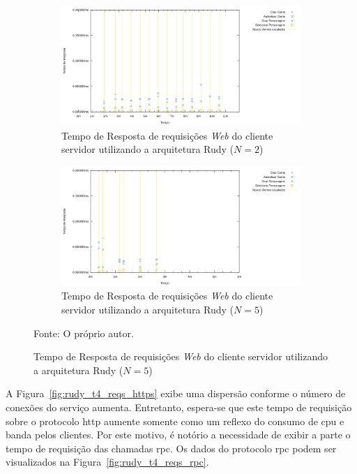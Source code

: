 \begin{figure}[htb!]
    \caption{Tempo de Resposta de requisições \textit{Web} do cliente servidor utilizando a arquitetura Rudy ($N=2$ e $N=5$)}
    \centering
    \begin{subfigure}{1.0\textwidth}
      \centering
      \includegraphics[width=.9\textwidth]{metricas_rudy_t5/rudyc_http.png}
      \caption{Tempo de Resposta de requisições \textit{Web} do cliente servidor utilizando a arquitetura Rudy ($N=2$)}
      \label{fig:rudy_t5_reqs_https}
    \end{subfigure}


    \begin{subfigure}{1.0\textwidth}
      \centering
      \includegraphics[width=.9\textwidth]{metricas_rudy_t6/rudyc_http.png}
      \caption{Tempo de Resposta de requisições \textit{Web} do cliente servidor utilizando a arquitetura Rudy ($N=5$)}
      \label{fig:rudy_t6_reqs_https}
    \end{subfigure}
    \label{fig:rudy_t56_reqs_https}

    Fonte: O próprio autor.
\end{figure}

A Figura~\ref{fig:rudy_t4_reqs_https} exibe uma dispersão conforme o número de conexões do serviço aumenta.
%
Entretanto, espera-se que este tempo de requisição sobre o protocolo \ac{http} aumente somente como um reflexo do consumo de \ac{cpu} e banda pelos clientes.
%
Por este motivo, é notório a necessidade de exibir a parte o tempo de requisição das chamadas \ac{rpc}.
%
Os dados do protocolo \ac{rpc} podem ser visualizados na Figura~\ref{fig:rudy_t4_reqs_rpc}.

